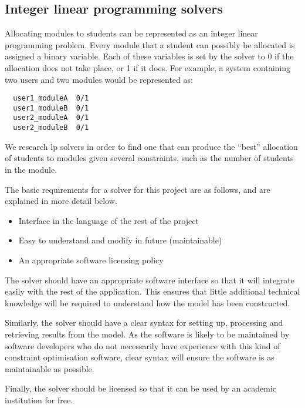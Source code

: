 
\subsection{Integer linear programming solvers}

Allocating modules to students can be represented as an integer linear
programming problem. Every module that a student can possibly be allocated is
assigned a binary variable. Each of these variables is set by the solver to 0
if the allocation does not take place, or 1 if it does. For example, a system
containing two users and two modules would be represented as:

\begin{verbatim}
  user1_moduleA  0/1
  user1_moduleB  0/1
  user2_moduleA  0/1
  user2_moduleB  0/1
\end{verbatim}

We research \gls{lp} solvers in order to find one that can produce the
``best'' allocation of students to modules given several constraints, such as
the number of students in the module.

The basic requirements for a solver for this project are as follows, and are
explained in more detail below.

\begin{itemize}
  \item Interface in the language of the rest of the project
  \item Easy to understand and modify in future (maintainable)
  \item An appropriate software licensing policy
\end{itemize}

The solver should have an appropriate software interface so that it will
integrate easily with the rest of the application. This ensures that little
additional technical knowledge will be required to understand how the model
has been constructed.

Similarly, the solver should have a clear syntax for setting up, processing
and retrieving results from the model. As the software is likely to be
maintained by software developers who do not necessarily have experience with
this kind of constraint optimisation software, clear syntax will ensure the
software is as maintainable as possible.

Finally, the solver should be licensed so that it can be used by an academic
institution for free.

% 
% 
% 
% 
% 
